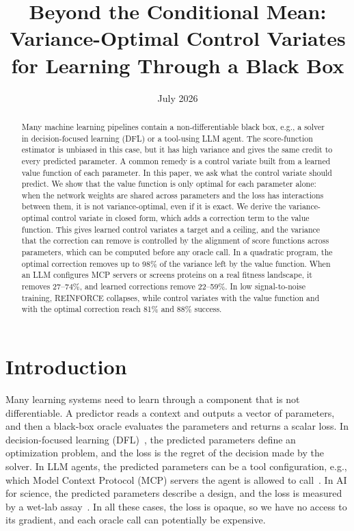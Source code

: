 \documentclass[10pt]{article}
\title{Beyond the Conditional Mean: Variance-Optimal Control Variates for Learning Through a Black Box}
\date{July 2026}
\theoremstyle{plain}
\theoremstyle{definition}
\theoremstyle{remark}
\theoremstyle{definition}
\begin{document}
\maketitle

\begin{abstract}
Many machine learning pipelines contain a non-differentiable black box, e.g., a solver in decision-focused learning (DFL) or a tool-using LLM agent. The score-function estimator is unbiased in this case, but it has high variance and gives the same credit to every predicted parameter. A common remedy is a control variate built from a learned value function of each parameter. In this paper, we ask what the control variate should predict. We show that the value function is only optimal for each parameter alone: when the network weights are shared across parameters and the loss has interactions between them, it is not variance-optimal, even if it is exact. We derive the variance-optimal control variate in closed form, which adds a correction term to the value function. This gives learned control variates a target and a ceiling, and the variance that the correction can remove is controlled by the alignment of score functions across parameters, which can be computed before any oracle call. In a quadratic program, the optimal correction removes up to 98\% of the variance left by the value function. When an LLM configures MCP servers or screens proteins on a real fitness landscape, it removes 27--74\%, and learned corrections remove 22--59\%. In low signal-to-noise training, REINFORCE collapses, while control variates with the value function and with the optimal correction reach 81\% and 88\% success.
\end{abstract}

\section{Introduction}\label{sec:intro}

Many learning systems need to learn through a component that is not differentiable. A predictor reads a context and outputs a vector of parameters, and then a black-box oracle evaluates the parameters and returns a scalar loss. In decision-focused learning (DFL)~\cite{elmachtoub2022,mandi2024}, the predicted parameters define an optimization problem, and the loss is the regret of the decision made by the solver. In LLM agents, the predicted parameters can be a tool configuration, e.g., which Model Context Protocol (MCP) servers the agent is allowed to call~\cite{mcp2024}. In AI for science, the predicted parameters describe a design, and the loss is measured by a wet-lab assay~\cite{wu2016gb1}. In all these cases, the loss is opaque, so we have no access to its gradient, and each oracle call can potentially be expensive.
\end{document}
